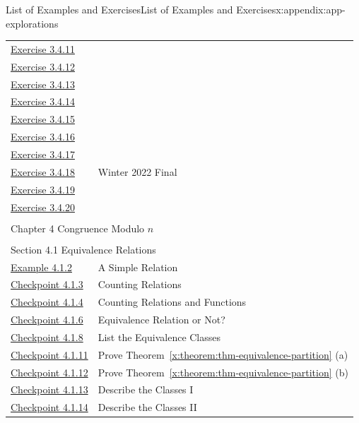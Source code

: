 \documentclass[oneside,10pt,]{book}
\newcommand{\xreffont}{\relax}
\numberwithin{equation}{section}
\begin{document}
\begin{appendixptx}{List of Examples and Exercises}{}{List of Examples and Exercises}{}{}{x:appendix:app-explorations}
\begin{longtable}[l]{ll}
\hyperlink{g:exercise:id534938}{Exercise 3.4.11}& \\
\hyperlink{g:exercise:id534972}{Exercise 3.4.12}& \\
\hyperlink{g:exercise:id535020}{Exercise 3.4.13}& \\
\hyperlink{g:exercise:id535023}{Exercise 3.4.14}& \\
\hyperlink{g:exercise:id535026}{Exercise 3.4.15}& \\
\hyperlink{g:exercise:id535002}{Exercise 3.4.16}& \\
\hyperlink{g:exercise:id535033}{Exercise 3.4.17}& \\
\hyperlink{g:exercise:id535090}{Exercise 3.4.18}& Winter 2022 Final\\
\hyperlink{g:exercise:id535093}{Exercise 3.4.19}& \\
\hyperlink{g:exercise:id535329}{Exercise 3.4.20}& \\
\multicolumn{2}{l}{\null}\\[1.5ex] \multicolumn{2}{l}{\large Chapter 4 Congruence Modulo \(n\)}\\[0.5ex]
\multicolumn{2}{l}{\null}\\[1.5ex] \multicolumn{2}{l}{\large Section 4.1 Equivalence Relations}\\[0.5ex]
\hyperref[x:example:eg-cong-relation]{Example 4.1.2}& A Simple Relation\\
\hyperref[x:exercise:ex-cong-relation-count]{Checkpoint 4.1.3}& Counting Relations\\
\hyperref[x:exercise:ex-cong-relation-count-2]{Checkpoint 4.1.4}& Counting Relations and Functions\\
\hyperref[x:exercise:ex-cong-equivalence-check]{Checkpoint 4.1.6}& Equivalence Relation or Not?\\
\hyperref[x:exercise:ex-cong-equivalence-class]{Checkpoint 4.1.8}& List the Equivalence Classes\\
\hyperref[x:exercise:ex-cong-equivalence-partition-proof-a]{Checkpoint 4.1.11}& Prove Theorem~{\xreffont\ref*{x:theorem:thm-equivalence-partition}} (a)\\
\hyperref[x:exercise:ex-cong-equivalence-partition-proof-b]{Checkpoint 4.1.12}& Prove Theorem~{\xreffont\ref*{x:theorem:thm-equivalence-partition}} (b)\\
\hyperref[x:exercise:ex-cong-equivalence-mod3]{Checkpoint 4.1.13}& Describe the Classes I\\
\hyperref[x:exercise:ex-cong-equivalence-largest]{Checkpoint 4.1.14}& Describe the Classes II\\

\end{longtable}
\end{appendixptx}
\end{document}
